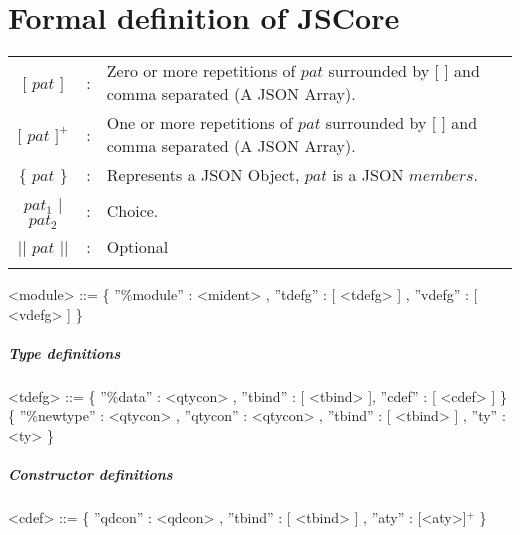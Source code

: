 
\chapter{Formal definition of JSCore}
\label{jscoregrammar}


\begin{scriptsize}
\leavevmode
\begin{longtable}{ c c l }


$[$ $pat$ $]$ 		& : 	& Zero or more repetitions of $pat$ surrounded by $[$ $]$ and comma separated (A JSON Array). 	\\
$[$ $pat$ $]^{+}$ 	& : 	& One or more repetitions of $pat$ surrounded by $[$ $]$ and comma separated (A JSON Array). 	\\ 
$\{$ $pat$ $\}$		& :	& Represents a JSON Object, $pat$ is a JSON $members$.						\\
$pat_{1}$ $|$ $pat_{2}$	& :	& Choice.											\\
$||$ $pat$ $||$ 	& :	& Optional											\\
\\[0.01in]

\end{longtable}



\begin{grammar}
<module> 	::= \{ ''\%module'' : <mident> , ''tdefg'' : [ <tdefg> ] , ''vdefg'' : [ <vdefg> ] \}
\end{grammar}

\paragraph{Type definitions}

\begin{grammar}
<tdefg> 	  ::= 	 \{ ''\%data'' : <qtycon> , ''tbind'' : [ <tbind> ], ''cdef'' : [ <cdef> ] \}						
		  \alt 	 \{ ''\%newtype'' : <qtycon> , ''qtycon'' : <qtycon> , ''tbind'' : [ <tbind> ] , ''ty'' : <ty> \} 	

\end{grammar}

\paragraph{Constructor definitions}

\begin{grammar}


<cdef>		  ::= 	 \{ ''qdcon'' : <qdcon> , ''tbind'' : [ <tbind>  ] , ''aty'' : [<aty>]$^{+}$ \} 				 			


\end{grammar}
\end{scriptsize}
